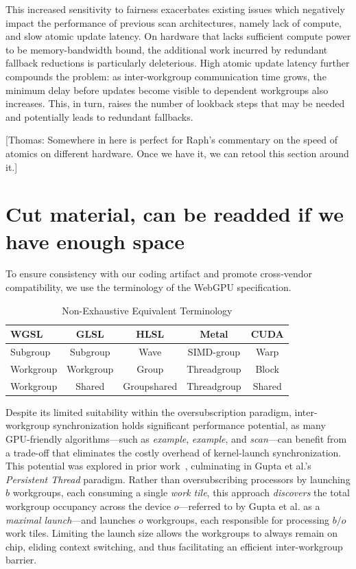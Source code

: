 \documentclass[sigconf]{acmart}
\newcommand{\thomas}[1]{{\footnotesize\color{orange}[Thomas: #1]}}
\begin{document}
This increased sensitivity to fairness exacerbates existing issues which negatively impact the performance of previous scan architectures, namely lack of compute, and slow atomic update latency. On hardware that lacks sufficient compute power to be memory-bandwidth bound, the additional work incurred by redundant fallback reductions is particularly deleterious. High atomic update latency further compounds the problem: as inter-workgroup communication time grows, the minimum delay before updates become visible to dependent workgroups also increases. This, in turn, raises the number of lookback steps that may be needed and potentially leads to redundant fallbacks.

\thomas{Somewhere in here is perfect for Raph's commentary on the speed of atomics on different hardware. Once we have it, we can retool this section around it.}

\section{Cut material, can be readded if we have enough space}

To ensure consistency with our coding artifact and promote cross-vendor compatibility, we use the terminology of the WebGPU specification.
\setlength{\tabcolsep}{3pt}
\begin{table}[h]
  \centering
  \caption{Non-Exhaustive Equivalent Terminology}
  \label{tab:terminology}
  \begin{tabular}{lcccc}
    \toprule
    \textbf{WGSL}   & \textbf{GLSL}  & \textbf{HLSL}   & \textbf{Metal}     & \textbf{CUDA} \\ \midrule
    Subgroup        & Subgroup       & Wave            & SIMD-group         & Warp          \\
    Workgroup       & Workgroup      & Group           & Threadgroup        & Block         \\
    Workgroup       & Shared         & Groupshared     & Threadgroup        & Shared        \\ \bottomrule
  \end{tabular}
\end{table}

Despite its limited suitability within the oversubscription paradigm, inter-workgroup synchronization holds significant performance potential, as many GPU-friendly algorithms—such as \emph{example}, \emph{example}, and \emph{scan}---can benefit from a trade-off that eliminates the costly overhead of kernel-launch synchronization. This potential was explored in prior work~\cite{}, culminating in Gupta et al.’s~\cite{} \emph{Persistent Thread} paradigm. Rather than oversubscribing processors by launching $b$ workgroups, each consuming a single \emph{work tile}, this approach \emph{discovers} the total workgroup occupancy across the device $o$---referred to by Gupta et al. as a \emph{maximal launch}---and launches $o$ workgroups, each responsible for processing $b/o$ work tiles. Limiting the launch size allows the workgroups to always remain on chip, eliding context switching, and thus facilitating an efficient inter-workgroup barrier.
\end{document}
